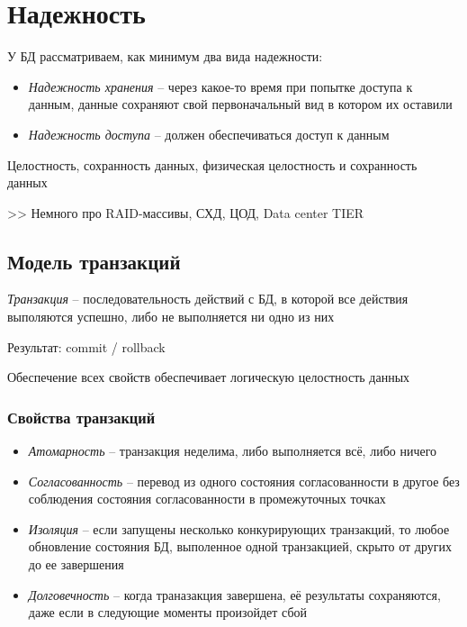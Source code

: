 \documentclass[12pt, a4paper]{article}
\begin{document}
\section{Надежность}
У БД рассматриваем, как минимум два вида надежности:

\begin{itemize}
    \item \emph{Надежность хранения} -- через какое-то время при попытке доступа к данным, данные сохраняют свой первоначальный вид в котором их оставили
    \item \emph{Надежность доступа} -- должен обеспечиваться доступ к данным
\end{itemize}

Целостность, сохранность данных, физическая целостность и сохранность данных

>> Немного про RAID-массивы, СХД, ЦОД, Data center TIER
\subsection{Модель транзакций}

\emph{Транзакция} -- последовательность действий с БД, в которой все действия выполяются успешно, либо не выполняется ни одно из них
 
Результат: commit / rollback

Обеспечение всех свойств обеспечивает логическую целостность данных
\subsubsection{Свойства транзакций}
\begin{itemize}
    \item \emph{Атомарность} -- транзакция неделима, либо выполняется всё, либо ничего
    \item \emph{Согласованность} -- перевод из одного состояния согласованности в другое без соблюдения состояния согласованности в промежуточных точках
    \item \emph{Изоляция} -- если запущены несколько конкурирующих транзакций, то любое обновление состояния БД, выполенное одной транзакцией, скрыто от других до ее завершения
    \item \emph{Долговечность} -- когда траназакция завершена, её результаты сохраняются, даже если в следующие моменты произойдет сбой
\end{itemize}
\end{document}
